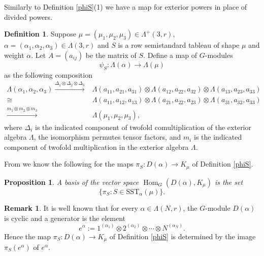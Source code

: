 \documentclass[11pt]{amsart}
\newtheorem{prop}[thm]{Proposition}
\theoremstyle{definition}
\newtheorem{defn}[thm]{Definition}
\newtheorem{rem}[thm]{Remark}
\numberwithin{equation}{section}
\DeclareMathOperator{\Hom}{Hom}
\begin{document}
Similarly to Definition \ref{phiS}(1) we have a map for exterior powers in place of divided powers. \begin{defn}\label{defpsiS}Suppose $\mu=(\mu_1,\mu_2,\mu_3) \in \Lambda^+(3,r)$, $\alpha=(\alpha_1,\alpha_2,\alpha_3) \in \Lambda(3,r)$ and $S$ is a row semistandard tableau of shape $\mu$ and weight $\alpha$. Let $A=(a_{ij})$ be the matrix of $S$. Define a map of $G$-modules \[\psi_S : \Lambda(\alpha) \to \Lambda{(\mu)}\] as the following composition
\begin{align}\label{psiS} \Lambda(\alpha_1, \alpha_2, \alpha_3) \xrightarrow{\Delta_1\otimes \Delta_2 \otimes \Delta_3}& \Lambda(a_{11},a_{21},a_{31}) \otimes \Lambda(a_{12},a_{22},a_{32}) \otimes \Lambda(a_{13},a_{23},a_{33}) \\\nonumber \cong &\Lambda(a_{11},a_{12},a_{13}) \otimes \Lambda(a_{21},a_{22},a_{23}) \otimes \Lambda(a_{31},a_{32},a_{33}) \\\nonumber\xrightarrow{m_1 \otimes m_2 \otimes m_3 }& \Lambda(\mu_1, \mu_2, \mu_3),
\end{align}
where $\Delta_i$ is the indicated component of twofold comultiplication of the exterior algebra $\Lambda$,  the isomorphism permutes tensor factors, and $m_i$ is the indicated component of twofold multiplication in the exterior algebra $\Lambda$.\end{defn}




From \cite[Section 2, eq. (11)]{AB} we know the following for the maps $\pi_S : D(\alpha) \to K_\mu$ of Definition \ref{phiS}. \begin{prop}\label{wbasis} A basis of the vector space $\Hom_G(D(\alpha), K_\mu)$ is the set \begin{equation}
	\{\pi_S: S \in \mathrm{SST}_\alpha(\mu)\}.
\end{equation}\end{prop}

\begin{rem}\label{cyclic}
	It is well known that for every $\alpha \in \Lambda(N,r)$, the $G$-module $D(\alpha)$ is cyclic and a generator is the element \begin{equation}\label{ealpha} e^\alpha := 1^{(\alpha_1)} \otimes 2^{(\alpha_2)} \otimes \cdots \otimes N^{(\alpha_N)}.\end{equation} Hence the map $\pi_S : D(\alpha) \to K_\mu$ of Definition \ref{phiS} is determined by the image $\pi_S (e^\alpha)$ of $e^\alpha$.
\end{rem}
\end{document}
